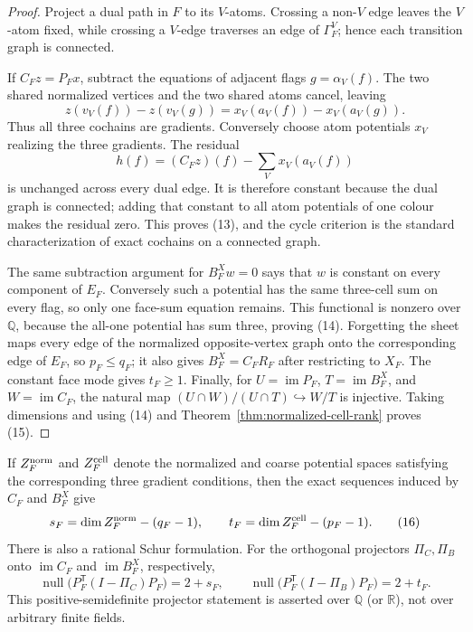\begin{proof}
Project a dual path in $F$ to its $V$-atoms.  Crossing a non-$V$ edge leaves
the $V$-atom fixed, while crossing a $V$-edge traverses an edge of
$\Gamma_F^V$; hence each transition graph is connected.

If $C_Fz=P_Fx$, subtract the equations of adjacent flags
$g=\alpha_V(f)$.  The two shared normalized vertices and the two shared
atoms cancel, leaving
\[
 z(v_V(f))-z(v_V(g))
   =x_V(a_V(f))-x_V(a_V(g)).
\]
Thus all three cochains are gradients.  Conversely choose atom potentials
$x_V$ realizing the three gradients.  The residual
\[
 h(f)=(C_Fz)(f)-\sum_Vx_V(a_V(f))
\]
is unchanged across every dual edge.  It is therefore constant because the
dual graph is connected; adding that constant to all atom potentials of one
colour makes the residual zero.  This proves (13), and the cycle criterion
is the standard characterization of exact cochains on a connected graph.

The same subtraction argument for $B_F^Xw=0$ says that $w$ is constant on
every component of $E_F$.  Conversely such a potential has the same
three-cell sum on every flag, so only one face-sum equation remains.  This
functional is nonzero over $\mathbb Q$, because the all-one potential has
sum three, proving (14).  Forgetting the sheet maps every edge of the
normalized opposite-vertex graph onto the corresponding edge of $E_F$, so
$p_F\leq q_F$; it also gives $B_F^X=C_FR_F$ after restricting to $X_F$.
The constant face mode gives $t_F\geq1$.  Finally, for
$U=\operatorname{im}P_F$, $T=\operatorname{im}B_F^X$, and
$W=\operatorname{im}C_F$, the natural map
$(U\cap W)/(U\cap T)\hookrightarrow W/T$ is injective.  Taking dimensions
and using (14) and Theorem~\ref{thm:normalized-cell-rank} proves (15).
\end{proof}

If $Z_F^{\rm norm}$ and $Z_F^{\rm cell}$ denote the normalized and coarse
potential spaces satisfying the corresponding three gradient conditions,
then the exact sequences induced by $C_F$ and $B_F^X$ give
\[
 s_F=\dim Z_F^{\rm norm}-(q_F-1),
 \qquad
 t_F=\dim Z_F^{\rm cell}-(p_F-1).                  \tag{16}
\]
There is also a rational Schur formulation.  For the orthogonal projectors
$\Pi_C,\Pi_B$ onto $\operatorname{im}C_F$ and
$\operatorname{im}B_F^X$, respectively,
\[
 \operatorname{null}\bigl(P_F^{\mathsf T}(I-\Pi_C)P_F\bigr)=2+s_F,
 \qquad
 \operatorname{null}\bigl(P_F^{\mathsf T}(I-\Pi_B)P_F\bigr)=2+t_F.
\]
This positive-semidefinite projector statement is asserted over
$\mathbb Q$ (or $\mathbb R$), not over arbitrary finite fields.

